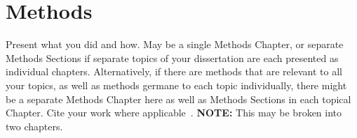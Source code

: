 \chapter{Methods}\label{chap:methods}

Present what you did and how. May be a single Methods Chapter, or separate Methods Sections if separate topics of your dissertation are each presented as individual chapters. Alternatively, if there are methods that are relevant to all your topics, as well as methods germane to each topic individually, there might be a separate Methods Chapter here as well as Methods Sections in each topical Chapter. Cite your work where applicable~\cite{AuthorYear}.
\textbf{NOTE:} This may be broken into two chapters.
\endinput
